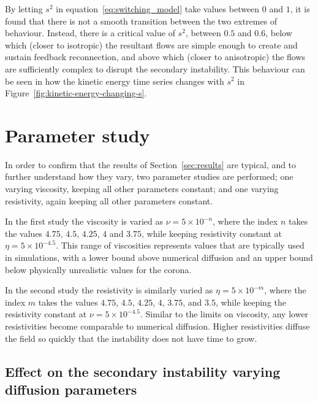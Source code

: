 By letting $s^2$ in equation~\eqref{eq:switching_model} take values between $0$ and $1$, it is found that there is not a smooth transition between the two extremes of behaviour. Instead, there is a critical value of $s^2$, between $0.5$ and $0.6$, below which (closer to isotropic) the resultant flows are simple enough to create and sustain feedback reconnection, and above which (closer to anisotropic) the flows are sufficiently complex to disrupt the secondary instability. This behaviour can be seen in how the kinetic energy time series changes with $s^2$ in Figure~\ref{fig:kinetic-energy-changing-s}.

\section{Parameter study}
\label{sec:results2}

In order to confirm that the results of Section~\ref{sec:results} are typical, and to further understand how they vary, two parameter studies are performed; one varying viscosity, keeping all other parameters constant; and one varying resistivity, again keeping all other parameters constant. 

In the first study the viscosity is varied as $\nu = 5 \times 10^{-n}$, where the index $n$ takes the values $4.75$, $4.5$, $4.25$, $4$ and $3.75$, while keeping resistivity constant at $\eta = 5\times10^{-4.5}$. This range of viscosities represents values that are typically used in simulations, with a lower bound above numerical diffusion and an upper bound below physically unrealistic values for the corona.

In the second study the resistivity is similarly varied as $\eta = 5 \times 10^{-m}$, where the index $m$ takes the values $4.75$, $4.5$, $4.25$, $4$, $3.75$, and $3.5$, while keeping the resistivity constant at $\nu = 5\times 10^{-4.5}$. Similar to the limits on viscosity, any lower resistivities become comparable to numerical diffusion. Higher resistivities diffuse the field so quickly that the instability does not have time to grow.

\subsection{Effect on the secondary instability varying diffusion parameters}
\label{sec:secondary_instability}

